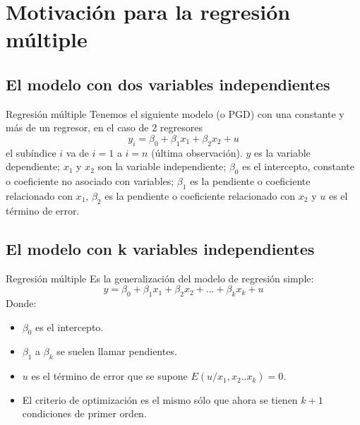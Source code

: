 \section{Motivación para la regresión múltiple}

\subsection{El modelo con dos variables independientes}
\begin{frame}{Regresión múltiple}
	Tenemos el siguiente modelo (o PGD) con una constante y más de un regresor, en el caso de 2 regresores
	$$y_i = \beta_{0} + \beta_{1}x_{1}+\beta_{2}x_{2}+u$$
	el subíndice $i$ va de $i = 1$ a $i = n$ (última observación). $y$
	es la variable dependiente; $x_1$ y $x_2$ son la variable independiente; $\beta_{0}$ es el intercepto, constante o coeficiente no asociado con variables; $\beta_{1}$ es la pendiente o coeficiente relacionado con $x_{1}$, $\beta_{2}$ es la pendiente o coeficiente relacionado con $x_{2}$ y $u$ es el término de error.
\end{frame}

\subsection{El modelo con k variables independientes}
\begin{frame}{Regresión múltiple}
	Es la generalización del modelo de regresión simple:
	$$y=\beta_{0}+\beta_{1}x_{1}+\beta_{2}x_{2}+...+\beta_{k}x_{k}+u$$
	Donde:
	\begin{itemize}
		\item $\beta_{0}$ es el intercepto.
		\item $\beta_{1}$ a $\beta_{k}$ se suelen llamar pendientes.
		\item $u$ es el término de error que se supone $E(u/x_{1},x_{2}..x_{k})=0$.
		\item El criterio de optimización es el mismo sólo que ahora se tienen $k+1$ condiciones de primer orden.
	\end{itemize}
\end{frame}

